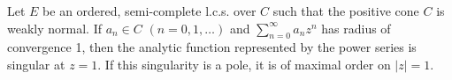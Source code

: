 Let $E$ be an ordered, semi-complete l.c.s. over $C$ such that the positive cone $C$ is weakly normal. If $a_n \in C$ $(n = 0, 1, \ldots)$ and $\sum_{n=0}^{\infty} a_n z^n$ has radius of convergence 1, then the analytic function represented by the power series is singular at $z = 1$. If this singularity is a pole, it is of maximal order on $|z| = 1$.
